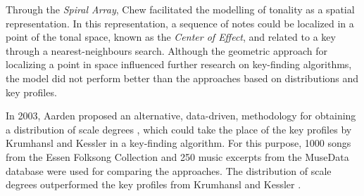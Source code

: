 
Through the \emph{Spiral Array}, Chew
\parencite{chew2002spiral} facilitated the modelling of
tonality as a spatial representation. In this
representation, a sequence of notes could be localized in a
point of the tonal space, known as the \emph{Center of
Effect}, and related to a key through a nearest-neighbours
search. Although the geometric approach for localizing a
point in space influenced further research on key-finding
algorithms, the model did not perform better than the
approaches based on distributions and key profiles.


In 2003, Aarden proposed an alternative, data-driven,
methodology for obtaining a distribution of scale degrees
\parencite{aarden2003dynamic}, which could take the place of
the key profiles by Krumhansl and Kessler
\parencite{krumhansl1982tracing} in a key-finding algorithm.
For this purpose, 1000 songs from the Essen Folksong
Collection and 250 music excerpts from the MuseData database
were used for comparing the approaches. The distribution of
scale degrees outperformed the key profiles from Krumhansl
and Kessler \parencite{krumhansl1982tracing}.





